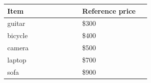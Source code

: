 \par\noindent\begin{minipage}{\columnwidth}
\centering
\begin{tabular}{@{}>{\raggedright\arraybackslash}p{0.46\linewidth}>{\raggedright\arraybackslash}p{0.42\linewidth}@{}}
\toprule
Item & Reference price \\
\midrule
guitar & \$300 \\
bicycle & \$400 \\
camera & \$500 \\
laptop & \$700 \\
sofa & \$900 \\
\bottomrule
\end{tabular}
\label{tab:items}
\end{minipage}\par

